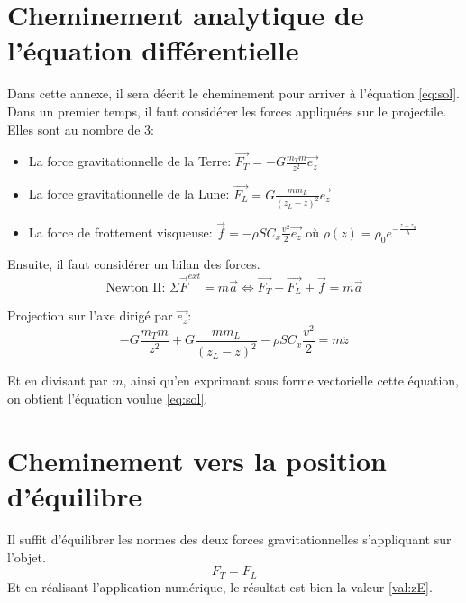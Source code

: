\documentclass[a4paper,12pt,twoside]{article}
\begin{document}
\section{Cheminement analytique de l'équation différentielle}
\label{ann:eq-diff}
Dans cette annexe, il sera décrit le cheminement pour arriver à l'équation \ref{eq:sol}.
Dans un premier temps, il faut considérer les forces appliquées sur le projectile.
Elles sont au nombre de 3:
\begin{itemize}
	\item La force gravitationnelle de la Terre: $\vec{F_T} = -G\frac{m_T m}{z^2}\vec{e_z}$ \cite{ref:ansermet}
	\item La force gravitationnelle de la Lune: $\vec{F_L} = G\frac{m m_L }{(z_L-z)^2}\vec{e_z}$
	\item La force de frottement visqueuse: $\vec{f} = - \rho S C_x \frac{v^2}{2}\vec{e_z}$ où $\rho (z) = \rho_0 e^{-\frac{z-z_0}{\lambda}}$
\end{itemize}

Ensuite, il faut considérer un bilan des forces.
\begin{equation}
	\text{Newton II: }\Sigma\vec{F}^{ext} = m\vec{a} \Leftrightarrow \vec{F_T} + \vec{F_L} + \vec{f} = m\vec{a}
\end{equation}

Projection sur l'axe dirigé par $\vec{e_z}$:
\begin{equation}
	-G\frac{m_T m}{z^2} + G\frac{m m_L }{(z_L-z)^2} - \rho S C_x \frac{v^2}{2} = m\ddot{z}
\end{equation}

Et en divisant par $m$, ainsi qu'en exprimant sous forme vectorielle cette équation, on obtient l'équation voulue \ref{eq:sol}.

\section{Cheminement vers la position d'équilibre}
\label{ann:pos-eq}
Il suffit d'équilibrer les normes des deux forces gravitationnelles s'appliquant sur l'objet.
\begin{equation}
	F_T = F_L
\end{equation}
Et en réalisant l'application numérique, le résultat est bien la valeur \ref{val:zE}.
\end{document}

